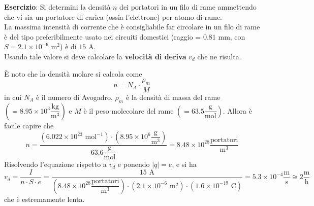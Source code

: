 \documentclass[a4paper]{extarticle}
\begin{document}
\vspace{2em}
\noindent
\textbf{Esercizio}: Si determini la densità $n$ dei portatori in un filo di rame ammettendo che vi sia un portatore di carica (ossia l'elettrone) per atomo di rame.\\
La massima intensità di corrente che è consigliabile far circolare in un filo di rame è del tipo preferibilmente usato nei circuiti domestici (raggio = $0.81$ mm, con $S = 2.1 \times 10^{-6}$ m${^2}$) è di $15$ A.\\
Usando tale valore si deve calcolare la \textbf{velocità di deriva} $v_d$ che ne risulta.

\vspace{1em}
\noindent
È noto che la densità molare si calcola come
\[n = N_A \cdot \dfrac{\rho_m}{M}\]
in cui $N_A$ è il numero di Avogadro, $\rho_m$ è la densità di massa del rame $\left( = 8.95 \times 10^3 \dfrac{\text{kg}}{\text{m}^3}\right)$ e $M$ è il peso molecolare del rame $\left(= 63.5 \dfrac{\text{g}}{\text{mol}}\right)$. Allora è facile capire che
\[n = \dfrac{\left(6.022 \times 10^{23} \text{ mol}^{-1}\right) \cdot \left(8.95 \times 10^6 \dfrac{\text{g}}{\text{m}^3} \right)}{63.6 \dfrac{\text{g}}{\text{mol}}} = 8.48 \times 10^{28} \dfrac{\text{portatori}}{\text{m}^3}\]
Risolvendo l'equazione rispetto a $v_d$ e ponendo $\vert q \vert = e$, e si ha
\[v_d = \dfrac{I}{n \cdot S \cdot e} = \dfrac{15 \text{ A}}{\left(8.48 \times 10^{28} \dfrac{\text{portatori}}{\text{m}^3}\right) \cdot \left(2.1 \times 10^{-6} \text{ m}^2\right) \cdot \left(1.6 \times 10^{-19} \text{ C}\right)} = 5.3 \times 10^{-4} \dfrac{\text{m}}{\text{s}} \cong 2 \dfrac{\text{m}}{\text{h}} \]
che è estremamente lenta.

\vspace{1em}
\noindent
\end{document}
